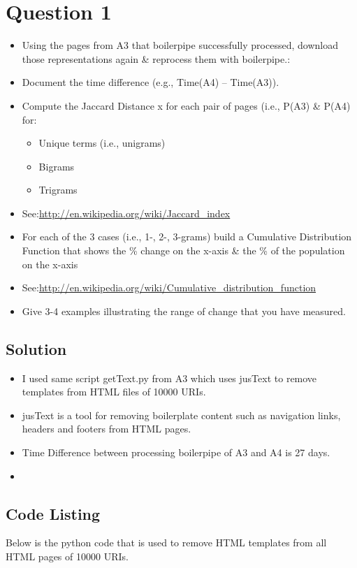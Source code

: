 
\section{Question 1}
\label{part1}

\begin{itemize}
\item Using the pages from A3 that boilerpipe successfully processed, download those representations again \& reprocess them with boilerpipe.:
\item Document the time difference (e.g., Time(A4) – Time(A3)).
\item Compute the Jaccard Distance x for each pair of pages (i.e., P(A3) \& P(A4) for:
 \begin{itemize}
\item Unique terms (i.e., unigrams)
\item Bigrams
\item Trigrams
\end{itemize}
\item See:\url{http://en.wikipedia.org/wiki/Jaccard_index }
\item For each of the 3 cases (i.e., 1-, 2-, 3-grams) build a Cumulative Distribution Function that shows the \% change on the x-axis \& the \% of the population on the x-axis
\item See:\url {http://en.wikipedia.org/wiki/Cumulative_distribution_function}
\item Give 3-4 examples illustrating the range of change that you have measured.
\end{itemize}
\subsection{Solution}

\begin{itemize}
	\item I used same script getText.py from A3 which uses jusText\cite{jusText} to remove templates from HTML files of 10000 URIs.
	\item jusText\cite{jusText} is a tool for removing boilerplate content such as navigation links, headers and footers from HTML pages.
	\item Time Difference between processing boilerpipe of A3 and A4 is 27 days.
	\item 
\end{itemize}

 \subsection{Code Listing}
Below is the python code that is used to remove HTML templates from all HTML pages of 10000 URIs.